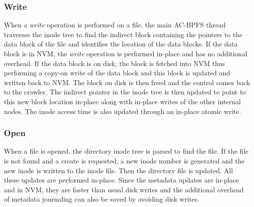 \subsubsection{Write}
When a \textit{write} operation is performed on a file, the main AC-BPFS thread traverses the inode tree to find the indirect block containing the pointers to the data block of the file and identifies the location of the data blocks. If the data block is in NVM, the \textit{write} operation is performed in-place and has no additional overhead. If the data block is on disk, the block is fetched into NVM thus performing a copy-on write of the data block and this block is updated and written back to NVM. The block on disk is then freed and the control comes back to the crawler. The indirect pointer in the inode tree is then updated to point to this new block location in-place along with in-place writes of the other internal nodes. The inode access time is also updated through an in-place atomic write.

\subsubsection{Open}
When a file is opened, the directory inode tree is parsed to find the file. If the file is not found and a create is requested, a new inode number is generated and the new inode is written to the inode file. Then the directory file is updated. All these updates are performed in-place. Since the metadata updates are in-place and in NVM, they are faster than usual disk writes and the additional overhead of metadata journaling can also be saved by avoiding disk writes.
